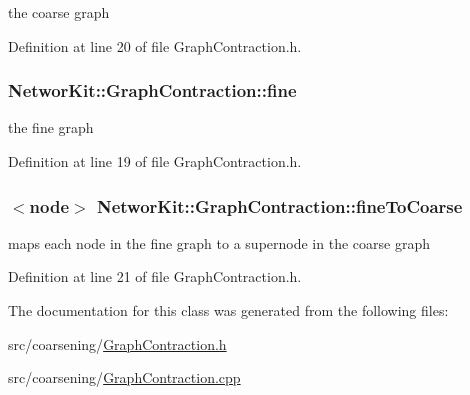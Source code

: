 the coarse graph 



Definition at line 20 of file Graph\-Contraction.\-h.

\hypertarget{class_networ_kit_1_1_graph_contraction_a8126596185e56b2350d1d21c6624ddd4}{
\subsubsection[{fine}]{ Networ\-Kit\-::\-Graph\-Contraction\-::fine\hspace{0.3cm}{\ttfamily [protected]}}}\label{class_networ_kit_1_1_graph_contraction_a8126596185e56b2350d1d21c6624ddd4}


the fine graph 



Definition at line 19 of file Graph\-Contraction.\-h.

\hypertarget{class_networ_kit_1_1_graph_contraction_a7e4f2528535522b9221c19c63c71900d}{
\subsubsection[{fine\-To\-Coarse}]{$<${\bf node}$>$ Networ\-Kit\-::\-Graph\-Contraction\-::fine\-To\-Coarse\hspace{0.3cm}{\ttfamily [protected]}}}\label{class_networ_kit_1_1_graph_contraction_a7e4f2528535522b9221c19c63c71900d}


maps each node in the fine graph to a supernode in the coarse graph 



Definition at line 21 of file Graph\-Contraction.\-h.



The documentation for this class was generated from the following files\-:\begin{DoxyCompactItemize}
\item 
src/coarsening/\hyperlink{_graph_contraction_8h}{Graph\-Contraction.\-h}\item 
src/coarsening/\hyperlink{_graph_contraction_8cpp}{Graph\-Contraction.\-cpp}\end{DoxyCompactItemize}

